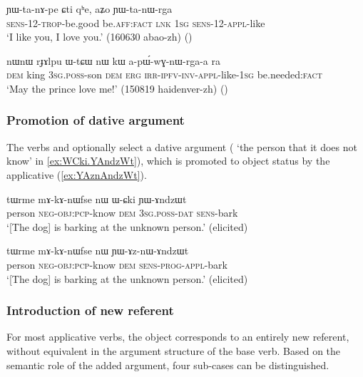\begin{exe}
\ex \label{ex:YWtanWrga}
\gll ɲɯ-ta-nɤ-pe ɕti qʰe, aʑo ɲɯ-ta-nɯ-rga \\
\textsc{sens}-1\fl{}2-\textsc{trop}-be.good be.\textsc{aff}:\textsc{fact} \textsc{lnk} \textsc{1sg} \textsc{sens}-1\fl{}2-\textsc{appl}-like \\
\glt `I like you, I love you.' (160630 abao-zh)
()
\end{exe}

\begin{exe}
\ex \label{ex:apWwGnWrgaa}
\gll nɯnɯ rɟɤlpu ɯ-tɕɯ nɯ kɯ a-pɯ́-wɣ-nɯ-rga-a ra \\
\textsc{dem} king \textsc{3sg}.\textsc{poss}-son \textsc{dem} \textsc{erg} \textsc{irr}-\textsc{ipfv}-\textsc{inv}-\textsc{appl}-like-\textsc{1sg} be.needed:\textsc{fact} \\
\glt `May the prince love me!' (150819 haidenver-zh)
()
\end{exe}

\subsubsection{Promotion of dative argument} \label{sec:applicative.dative}
The verbs  and  optionally select a dative argument ( `the person that it does not know' in \ref{ex:WCki.YAndzWt}), which is promoted to object status by the applicative (\ref{ex:YAznAndzWt}).

\begin{exe}
\ex \label{ex:WCki.YAndzWt}
\gll tɯrme mɤ-kɤ-nɯfse nɯ ɯ-ɕki ɲɯ-ɤndzɯt \\
person \textsc{neg}-\textsc{obj}:\textsc{pcp}-know \textsc{dem} \textsc{3sg}.\textsc{poss}-\textsc{dat} \textsc{sens}-bark \\
\glt `[The dog] is barking at the unknown person.' (elicited)
\end{exe}

\begin{exe}
\ex \label{ex:YAznAndzWt}
\gll tɯrme mɤ-kɤ-nɯfse nɯ ɲɯ-ɤz-nɯ-ɤndzɯt \\
person \textsc{neg}-\textsc{obj}:\textsc{pcp}-know \textsc{dem} \textsc{sens}-\textsc{prog}-\textsc{appl}-bark \\
\glt `[The dog] is barking at the unknown person.' (elicited)
\end{exe}

\subsubsection{Introduction of new referent}
For most applicative verbs, the object corresponds to an entirely new referent, without equivalent in the argument structure of the base verb. Based on the semantic role of the added argument, four sub-cases can be distinguished.


